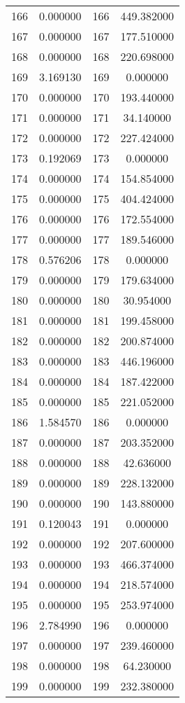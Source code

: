 \documentclass[12pt]{article}
\begin{document}
\begin{longtable}{@{}cccc@{}}
166 & 0.000000 & 166 & 449.382000 \\
167 & 0.000000 & 167 & 177.510000 \\
168 & 0.000000 & 168 & 220.698000 \\
169 & 3.169130 & 169 & 0.000000 \\
170 & 0.000000 & 170 & 193.440000 \\
171 & 0.000000 & 171 & 34.140000 \\
172 & 0.000000 & 172 & 227.424000 \\
173 & 0.192069 & 173 & 0.000000 \\
174 & 0.000000 & 174 & 154.854000 \\
175 & 0.000000 & 175 & 404.424000 \\
176 & 0.000000 & 176 & 172.554000 \\
177 & 0.000000 & 177 & 189.546000 \\
178 & 0.576206 & 178 & 0.000000 \\
179 & 0.000000 & 179 & 179.634000 \\
180 & 0.000000 & 180 & 30.954000 \\
181 & 0.000000 & 181 & 199.458000 \\
182 & 0.000000 & 182 & 200.874000 \\
183 & 0.000000 & 183 & 446.196000 \\
184 & 0.000000 & 184 & 187.422000 \\
185 & 0.000000 & 185 & 221.052000 \\
186 & 1.584570 & 186 & 0.000000 \\
187 & 0.000000 & 187 & 203.352000 \\
188 & 0.000000 & 188 & 42.636000 \\
189 & 0.000000 & 189 & 228.132000 \\
190 & 0.000000 & 190 & 143.880000 \\
191 & 0.120043 & 191 & 0.000000 \\
192 & 0.000000 & 192 & 207.600000 \\
193 & 0.000000 & 193 & 466.374000 \\
194 & 0.000000 & 194 & 218.574000 \\
195 & 0.000000 & 195 & 253.974000 \\
196 & 2.784990 & 196 & 0.000000 \\
197 & 0.000000 & 197 & 239.460000 \\
198 & 0.000000 & 198 & 64.230000 \\
199 & 0.000000 & 199 & 232.380000 \\

\end{longtable}
\end{document}
